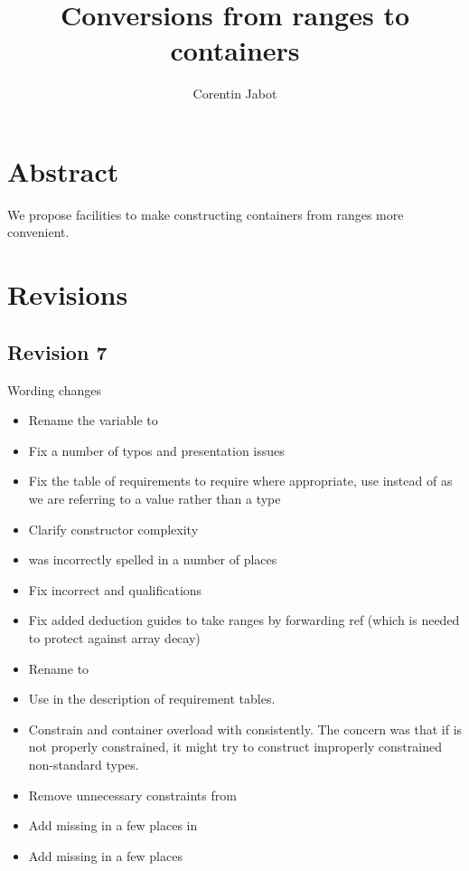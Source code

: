 \documentclass{wg21}
\title{Conversions from ranges to containers}
\author{Corentin Jabot}{corentin.jabot@gmail.com}
\begin{document}
\maketitle

\section{Abstract}

We propose facilities to make constructing containers from ranges more convenient.

\section{Revisions}

\subsection*{Revision 7}
Wording changes
\begin{itemize}
    \item Rename the variable  to 
    \item Fix a number of typos and presentation issues
    \item Fix the table of requirements to require  where appropriate, use   instead of  as we are referring to a value rather than a type
    \item Clarify  constructor complexity
    \item {} was incorrectly spelled in a number of places
    \item Fix incorrect  and  qualifications
    \item Fix added deduction guides to take ranges by forwarding ref (which is needed to protect against array decay)
    \item Rename  to 
    \item Use  in the description of requirement tables.
    \item Constrain  and container  overload with  consistently. The concern was that
    if  is not properly constrained, it might try to construct improperly constrained non-standard types.
    \item Remove unnecessary constraints from 
    \item Add missing  in a few places in 
    \item Add missing  in a few places
\end{itemize}
\end{document}
